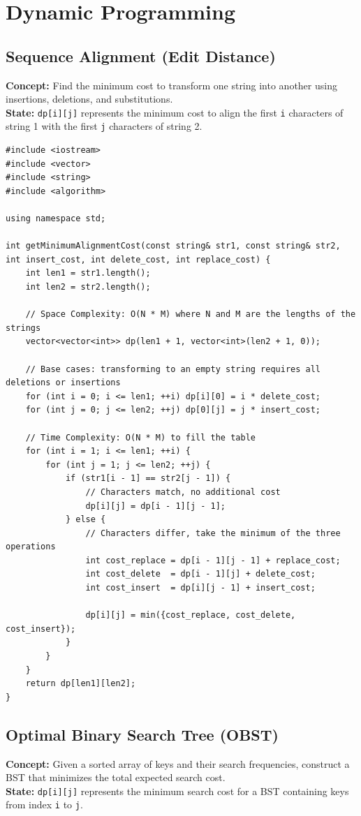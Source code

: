 \section{Dynamic Programming}

\subsection{Sequence Alignment (Edit Distance)}
\textbf{Concept:} Find the minimum cost to transform one string into another using insertions, deletions, and substitutions. \\
\textbf{State:} \texttt{dp[i][j]} represents the minimum cost to align the first \texttt{i} characters of string 1 with the first \texttt{j} characters of string 2.

\begin{lstlisting}
#include <iostream>
#include <vector>
#include <string>
#include <algorithm>

using namespace std;

int getMinimumAlignmentCost(const string& str1, const string& str2, int insert_cost, int delete_cost, int replace_cost) {
    int len1 = str1.length();
    int len2 = str2.length();
    
    // Space Complexity: O(N * M) where N and M are the lengths of the strings
    vector<vector<int>> dp(len1 + 1, vector<int>(len2 + 1, 0));
    
    // Base cases: transforming to an empty string requires all deletions or insertions
    for (int i = 0; i <= len1; ++i) dp[i][0] = i * delete_cost;
    for (int j = 0; j <= len2; ++j) dp[0][j] = j * insert_cost;
    
    // Time Complexity: O(N * M) to fill the table
    for (int i = 1; i <= len1; ++i) {
        for (int j = 1; j <= len2; ++j) {
            if (str1[i - 1] == str2[j - 1]) {
                // Characters match, no additional cost
                dp[i][j] = dp[i - 1][j - 1];
            } else {
                // Characters differ, take the minimum of the three operations
                int cost_replace = dp[i - 1][j - 1] + replace_cost;
                int cost_delete  = dp[i - 1][j] + delete_cost;
                int cost_insert  = dp[i][j - 1] + insert_cost;
                
                dp[i][j] = min({cost_replace, cost_delete, cost_insert});
            }
        }
    }
    return dp[len1][len2];
}
\end{lstlisting}

\subsection{Optimal Binary Search Tree (OBST)}
\textbf{Concept:} Given a sorted array of keys and their search frequencies, construct a BST that minimizes the total expected search cost. \\
\textbf{State:} \texttt{dp[i][j]} represents the minimum search cost for a BST containing keys from index \texttt{i} to \texttt{j}.

